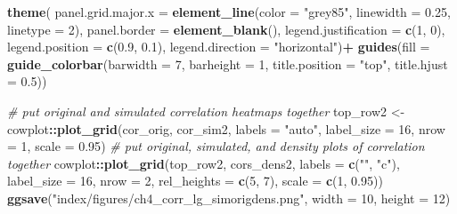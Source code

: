 \documentclass[12pt, twoside]{amherstthesis}
\newenvironment{Shaded}{\begin{snugshade}}{\end{snugshade}}
\newcommand{\AttributeTok}[1]{\textcolor[rgb]{0.13,0.29,0.53}{#1}}
\newcommand{\CommentTok}[1]{\textcolor[rgb]{0.56,0.35,0.01}{\textit{#1}}}
\newcommand{\DecValTok}[1]{\textcolor[rgb]{0.00,0.00,0.81}{#1}}
\newcommand{\FloatTok}[1]{\textcolor[rgb]{0.00,0.00,0.81}{#1}}
\newcommand{\FunctionTok}[1]{\textcolor[rgb]{0.13,0.29,0.53}{\textbf{#1}}}
\newcommand{\NormalTok}[1]{#1}
\newcommand{\OtherTok}[1]{\textcolor[rgb]{0.56,0.35,0.01}{#1}}
\newcommand{\SpecialCharTok}[1]{\textcolor[rgb]{0.81,0.36,0.00}{\textbf{#1}}}
\newcommand{\StringTok}[1]{\textcolor[rgb]{0.31,0.60,0.02}{#1}}
\begin{document}
\begin{Shaded}
\begin{Highlighting}[]
  \FunctionTok{theme}\NormalTok{(}
    \AttributeTok{panel.grid.major.x =} \FunctionTok{element\_line}\NormalTok{(}\AttributeTok{color =} \StringTok{"grey85"}\NormalTok{,}
                                      \AttributeTok{linewidth =} \FloatTok{0.25}\NormalTok{,}
                                      \AttributeTok{linetype =} \DecValTok{2}\NormalTok{), }
    \AttributeTok{panel.border =} \FunctionTok{element\_blank}\NormalTok{(),}
    \AttributeTok{legend.justification =} \FunctionTok{c}\NormalTok{(}\DecValTok{1}\NormalTok{, }\DecValTok{0}\NormalTok{),}
    \AttributeTok{legend.position =} \FunctionTok{c}\NormalTok{(}\FloatTok{0.9}\NormalTok{, }\FloatTok{0.1}\NormalTok{),}
    \AttributeTok{legend.direction =} \StringTok{"horizontal"}\NormalTok{)}\SpecialCharTok{+}
  \FunctionTok{guides}\NormalTok{(}\AttributeTok{fill =} \FunctionTok{guide\_colorbar}\NormalTok{(}\AttributeTok{barwidth =} \DecValTok{7}\NormalTok{, }\AttributeTok{barheight =} \DecValTok{1}\NormalTok{,}
                               \AttributeTok{title.position =} \StringTok{"top"}\NormalTok{, }\AttributeTok{title.hjust =} \FloatTok{0.5}\NormalTok{))}

\CommentTok{\# put original and simulated correlation heatmaps together}
\NormalTok{top\_row2 }\OtherTok{\textless{}{-}}\NormalTok{ cowplot}\SpecialCharTok{::}\FunctionTok{plot\_grid}\NormalTok{(cor\_orig, cor\_sim2, }\AttributeTok{labels =} \StringTok{"auto"}\NormalTok{, }\AttributeTok{label\_size =} \DecValTok{16}\NormalTok{, }
                              \AttributeTok{nrow =} \DecValTok{1}\NormalTok{, }\AttributeTok{scale =} \FloatTok{0.95}\NormalTok{)}
\CommentTok{\# put original, simulated, and density plots of correlation together}
\NormalTok{cowplot}\SpecialCharTok{::}\FunctionTok{plot\_grid}\NormalTok{(top\_row2, cors\_dens2, }\AttributeTok{labels =} \FunctionTok{c}\NormalTok{(}\StringTok{""}\NormalTok{, }\StringTok{"c"}\NormalTok{), }\AttributeTok{label\_size =} \DecValTok{16}\NormalTok{, }
                   \AttributeTok{nrow =} \DecValTok{2}\NormalTok{, }\AttributeTok{rel\_heights =} \FunctionTok{c}\NormalTok{(}\DecValTok{5}\NormalTok{, }\DecValTok{7}\NormalTok{), }\AttributeTok{scale =} \FunctionTok{c}\NormalTok{(}\DecValTok{1}\NormalTok{, }\FloatTok{0.95}\NormalTok{))}
\FunctionTok{ggsave}\NormalTok{(}\StringTok{"index/figures/ch4\_corr\_lg\_simorigdens.png"}\NormalTok{, }\AttributeTok{width =} \DecValTok{10}\NormalTok{, }\AttributeTok{height =} \DecValTok{12}\NormalTok{)}
\end{Highlighting}
\end{Shaded}
\normalsize
\end{document}
